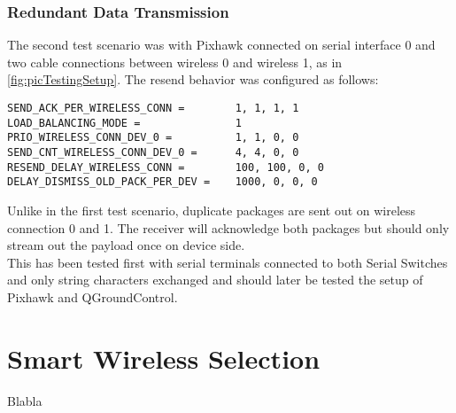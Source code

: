 \subsubsection{Redundant Data Transmission}
The second test scenario was with Pixhawk connected on serial interface 0 and two cable connections between wireless 0 and wireless 1, as in \autoref{fig:picTestingSetup}. The resend behavior was configured as follows:
\begin{lstlisting}
SEND_ACK_PER_WIRELESS_CONN =		1, 1, 1, 1
LOAD_BALANCING_MODE =				1
PRIO_WIRELESS_CONN_DEV_0 =			1, 1, 0, 0
SEND_CNT_WIRELESS_CONN_DEV_0 =		4, 4, 0, 0
RESEND_DELAY_WIRELESS_CONN =		100, 100, 0, 0
DELAY_DISMISS_OLD_PACK_PER_DEV =	1000, 0, 0, 0
\end{lstlisting}
Unlike in the first test scenario, duplicate packages are sent out on wireless connection 0 and 1. The receiver will acknowledge both packages but should only stream out the payload once on device side.\\
This has been tested first with serial terminals connected to both Serial Switches and only string characters exchanged and should later be tested the setup of Pixhawk and QGroundControl.
%
%
%
%
%
\section{Smart Wireless Selection} \label{sec:txtSmartWirelessSelection}
Blabla